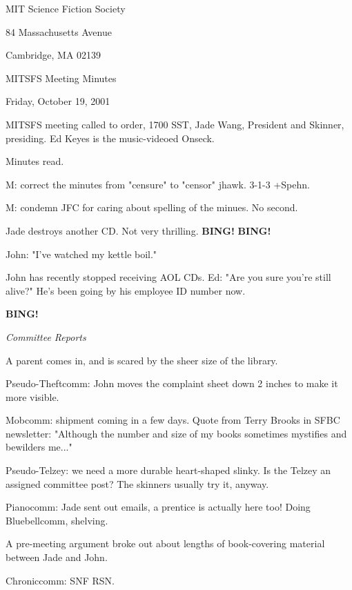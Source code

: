 \documentclass[12pt]{article}
\newcommand{\bing}{{\bf BING!} }
\newcommand{\goto}[1]{\bing \vskip 12pt \centerline{{\em{#1}}}}
\begin{document}
\begin{center}

MIT Science Fiction Society 

84 Massachusetts Avenue

Cambridge, MA 02139

\vspace{12pt}

MITSFS Meeting Minutes 

Friday, October 19, 2001

\end{center}
 
\vspace{18pt}

\setlength{\parskip}{6pt}

\noindent
MITSFS meeting called to order, 1700 SST, Jade Wang, President and
Skinner, presiding.  Ed Keyes is the music-videoed Onseck.

Minutes read.

M: correct the minutes from "censure" to "censor" jhawk. 3-1-3 +Spehn.

M: condemn JFC for caring about spelling of the minues. No second.

Jade destroys another CD. Not very thrilling. \bing \bing

John: "I've watched my kettle boil."

John has recently stopped receiving AOL CDs. Ed: "Are you sure you're still alive?" He's been going by his employee ID number now.

\goto{Committee Reports}

A parent comes in, and is scared by the sheer size of the library.

Pseudo-Theftcomm: John moves the complaint sheet down 2 inches to make it more visible.

Mobcomm: shipment coming in a few days. Quote from Terry Brooks in SFBC newsletter: "Although the number and size of my books sometimes mystifies and bewilders me..."

Pseudo-Telzey: we need a more durable heart-shaped slinky. Is the Telzey an assigned committee post? The skinners usually try it, anyway.

Pianocomm: Jade sent out emails, a prentice is actually here too! Doing Bluebellcomm, shelving.

A pre-meeting argument broke out about lengths of book-covering material between Jade and John.

Chroniccomm: SNF RSN.
\end{document}
